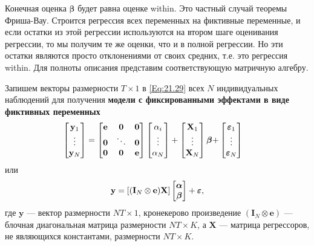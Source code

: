 Конечная оценка $\bm\beta$ будет равна оценке within. Это частный случай теоремы Фриша-Вау. Строится регрессия всех переменных на фиктивные переменные, и если остатки из этой регрессии используются на втором шаге оценивания регрессии, то мы получим те же оценки, что и в полной регрессии. Но эти остатки являются просто отклонениями от своих средних, т.е. это регрессия within. Для полноты описания представим соответствующую матричную алгебру.

Запишем векторы размерности $T \times 1$ в \ref{Eq:21.29} всех $N$ индивидуальных наблюдений для получения \textbf{модели с фиксированными эффектами в виде фиктивных переменных}
\begin{align}
\begin{bmatrix}
 \mathbf y_{1} \\
 \vdots \\
 \mathbf y_{N}
\end{bmatrix}
=
\begin{bmatrix}
\mathbf e & \mathbf 0 & \mathbf 0 \\
\mathbf 0 & \ddots & \mathbf 0\\
\mathbf 0 & \mathbf 0 & \mathbf e
\end{bmatrix}
\begin{bmatrix}
\alpha_i \\ \vdots \\  \alpha_N 
\end{bmatrix}
+
\begin{bmatrix}
 \mathbf X_{1} \\ \vdots \\ \mathbf X_N
\end{bmatrix}
\bm\beta
+
&\begin{bmatrix}
 \bm{\varepsilon}_{1} \\
 \vdots \\
 \bm{\varepsilon}_{N}
\end{bmatrix}
\nonumber
\end{align}
или
\begin{align}
\mathbf y=[(\mathbf I_N \otimes \mathbf e) \mathbf X] 
\begin{bmatrix}
 \bm\alpha \\ \bm\beta
\end{bmatrix}
+\bm{\varepsilon},
\label{Eq:21.39}
\end{align}
где $\mathbf y$ --- вектор размерности $NT \times 1$, кронекерово произведение $(\mathbf I_N \otimes \mathbf e)$ --- блочная диагональная матрица размерности $NT \times K$, а $ \mathbf X$ --- матрица регрессоров, не являющихся константами, размерности $NT \times K$.

